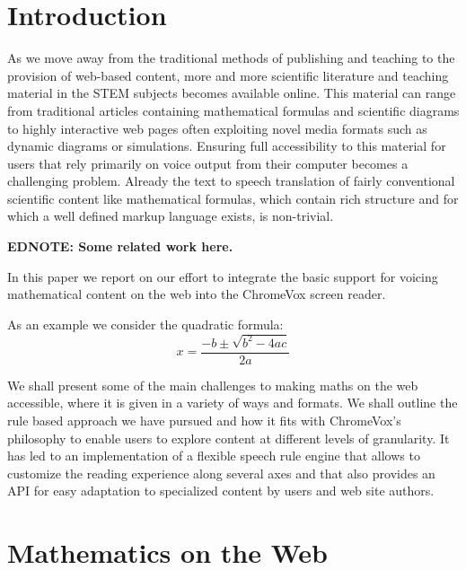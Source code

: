 \documentclass{acm_proc_article-sp}
\newcommand\ednote[1]{\typeout{There is still a note!!!}%
  {\bf EDNOTE: #1}}
\begin{document}


\section{Introduction}\label{sec:intro} As we move away from the traditional
methods of publishing and teaching to the provision of web-based content, more
and more scientific literature and teaching material in the STEM subjects
becomes available online. This material can range from traditional articles
containing mathematical formulas and scientific diagrams to highly interactive
web pages often exploiting novel media formats such as dynamic diagrams or
simulations. Ensuring full accessibility to this material for users that rely
primarily on voice output from their computer becomes a challenging
problem. Already the text to speech translation of fairly conventional
scientific content like mathematical formulas, which contain rich structure and
for which a well defined markup language exists, is non-trivial.


\ednote{Some related work here.}

In this paper we report on our effort to integrate the basic support
for voicing mathematical content on the web into the ChromeVox screen
reader. 



As an example we consider the quadratic formula:
\begin{equation}
  \label{eq:quadratic}
  x=\frac{-b \pm \sqrt {b^2-4ac}}{2a}
\end{equation}


We shall present some of the main challenges to making maths
on the web accessible, where it is given in a variety of ways and
formats. We shall outline the rule based approach we have pursued and
how it fits with ChromeVox's philosophy to enable users to explore
content at different levels of granularity. It has led to an
implementation of a flexible speech rule engine that allows to
customize the reading experience along several axes and that also
provides an API for easy adaptation to specialized content by users
and web site authors.
\newpage

\section{Mathematics on the Web}
\label{sec:math}
\end{document}
